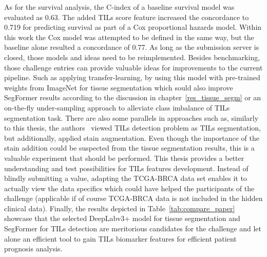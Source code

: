 As for the survival analysis, the C-index of a baseline survival model was evaluated as 0.63.
The added TILs score feature increased the concordance to 0.719 for predicting
survival as part of a Cox proportional hazards model. Within this work the Cox model
was attempted to be defined in the same way, but the baseline alone resulted a concordance of 0.77.
As long as the submission server is closed, those models and ideas need to be reimplemented.
Besides benchmarking, those challenge entries can provide valuable ideas for improvements to the current pipeline.
Such as applying transfer-learning, by using this model with pre-trained weights from ImageNet for tissue
segmentation which sould also improve SegFormer results according to the discussion in chapter~\ref{res_tissue_segm}
or an on-the-fly under-sampling approach to alleviate class imbalance of TILs segmentation task.
There are also some parallels in approaches such as, similarly to this thesis, the authors~\cite{shephard2022tiager}
viewed TILs detection problem as TILs segmentation, but additionally, applied stain augmentation. Even though the
importance of the stain addition could be
suspected from the tissue segmentation results, this is a valuable experiment that should be performed.
This thesis provides a better understanding and test possibilities for TILs features development.
Instead of blindly submitting a value, adapting the TCGA-BRCA data set enables it to actually view the data specifics
which could have helped the participants of the challenge (applicable if of course TCGA-BRCA data is not included in
the hidden clinical data).
Finally, the results depicted in Table~\ref{tab:compare_paper} showcase that the selected DeepLabv3+
model for tissue segmentation and SegFormer for TILs detection are meritorious candidates for the
challenge and let alone an efficient tool to gain TILs biomarker features for efficient patient
prognosis analysis.